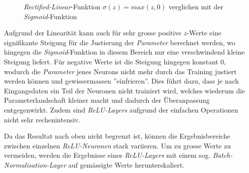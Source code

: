\begin{figure}[h]
	\centering
	\caption[\textit{Rectified-Linear}-Funktion]{\textit{Rectified-Linear}-Funktion $\sigma(z) = max(z,0)$ verglichen mit der \textit{Sigmoid}-Funktion}
	\label{plt:rect_lin}
\end{figure}

Aufgrund der Linearität kann auch für sehr grosse positive $z$-Werte eine signifikante Steigung für die Justierung der \textit{Parameter} berechnet werden, wo hingegen die \textit{Sigmoid}-Funktion in diesem Bereich nur eine verschwindend kleine Steigung liefert. Für negative Werte ist die Steigung hingegen konstant 0, wodurch die \textit{Parameter} jenes Neurons nicht mehr durch das Training justiert werden können und gewissermassen ''einfrieren''. Dies führt dazu, dass je nach Eingangsdaten ein Teil der Neuronen nicht trainiert wird, welches wiederum die Parameterlandschaft kleiner macht und dadurch der Überanpassung entgegenwirkt. Zudem sind \textit{ReLU-Layers} aufgrund der einfachen Operationen nicht sehr rechenintensiv.

Da das Resultat nach oben nicht begrenzt ist, können die Ergebnisbereiche zwischen einzelnen \textit{ReLU-Neuronen} stark variieren. Um zu grosse Werte zu vermeiden, werden die Ergebnisse eines \textit{ReLU-Layers} mit einem sog. \textit{Batch-Normalisation-Layer} auf gemässigte Werte herunterskaliert.

%
%

